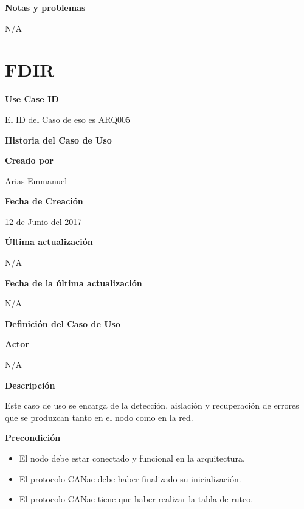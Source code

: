\large\textbf{Notas y problemas}
\vspace{3mm}

N/A



\section{FDIR}\label{uc:FDIR}

\large\textbf{Use Case ID}
\vspace{3mm}

El ID del Caso de eso es ARQ005

\Large\textbf{Historia del Caso de Uso}
\vspace{3mm}

\large\textbf{Creado por}
\vspace{3mm}

Arias Emmanuel

\large\textbf{Fecha de Creación}
\vspace{3mm}

12 de Junio del 2017

\large\textbf{Última actualización}
\vspace{3mm}

N/A

\large\textbf{Fecha de la última actualización}
\vspace{3mm}

N/A

\Large\textbf{Definición del Caso de Uso}
\vspace{3mm}

\large\textbf{Actor}
\vspace{3mm}

N/A

\large\textbf{Descripción}
\vspace{3mm}

Este caso de uso se encarga de la detección, aislación
y recuperación de errores que se produzcan tanto en el nodo
como en la red.

\large\textbf{Precondición}
\begin{itemize}
\item El nodo debe estar conectado y funcional en la arquitectura.
\item El protocolo CANae debe haber finalizado su inicialización.
\item El protocolo CANae tiene que haber realizar la tabla de ruteo.
\end{itemize}

